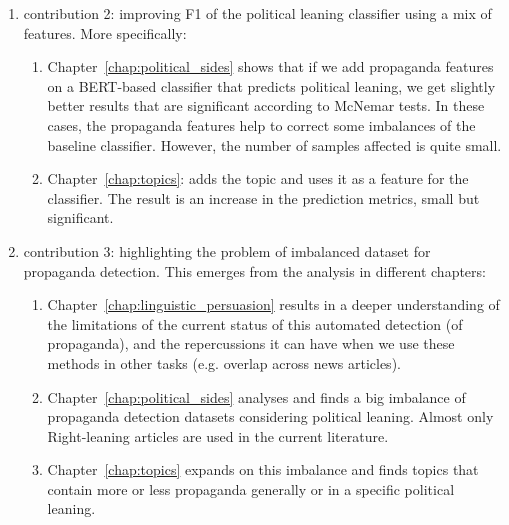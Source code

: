 \begin{enumerate}
\begin{enumerate}
    \end{enumerate}
    \item contribution 2: improving F1 of the political leaning classifier using a mix of features. More specifically:
    \begin{enumerate}
        \item Chapter~\ref{chap:political_sides}  shows that if we add propaganda features on a BERT-based classifier that predicts political leaning, we get slightly better results that are significant according to McNemar tests. In these cases, the propaganda features help to correct some imbalances of the baseline classifier. However, the number of samples affected is quite small.
        \item Chapter~\ref{chap:topics}: adds the topic and uses it as a feature for the classifier. The result is an increase in the prediction metrics, small but significant.
    \end{enumerate}
    \item contribution 3: highlighting the problem of imbalanced dataset for propaganda detection. This emerges from the analysis in different chapters:
    \begin{enumerate}
        \item Chapter~\ref{chap:linguistic_persuasion} results in a deeper understanding of the limitations of the current status of this automated detection (of propaganda), and the repercussions it can have when we use these methods in other tasks (e.g. overlap across news articles).
        \item Chapter~\ref{chap:political_sides} analyses and finds a big imbalance of propaganda detection datasets considering political leaning. Almost only Right-leaning articles are used in the current literature.
        \item Chapter~\ref{chap:topics} expands on this imbalance and finds topics that contain more or less propaganda generally or in a specific political leaning.
    \end{enumerate}


\end{enumerate}
